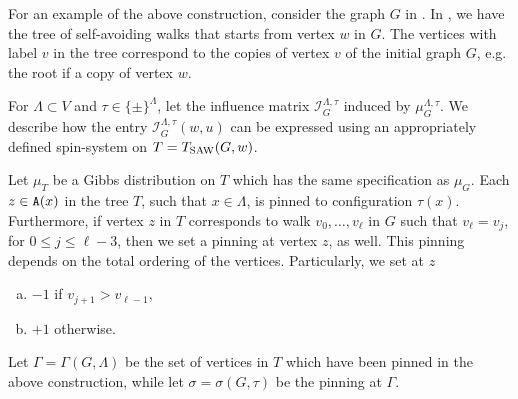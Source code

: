 \documentclass[11pt,reqno]{amsart}
\numberwithin{equation}{section}
\newcommand{\cI}{{\mathcal{I}}}
\newcommand{\applegreen}[1]{ {\color{applegreen}#1}}
\newcommand{\blue}[1]{{\color{blue}#1}}
\newcommand{\cadmiumgreen}[1]{{\color{cadmiumgreen}#1}}
\newcommand{\coquelicot}[1]{{\color{coquelicot}#1}}
\newcommand{\electricviolet}[1]{{\color{electricviolet}#1}}
\newcommand{\heliotrope}[1]{{\color{heliotrope}#1}}
\newcommand{\red}[1]{{\color{red}#1}}
\newcommand{\Tsaw}{T_{\rm SAW}}
\newcommand{\cp}{{\tt A}}
\newcommand{\infmatrix}{\cI}
\renewcommand{\applegreen}[1]{#1}
\renewcommand{\blue}[1]{#1}
\renewcommand{\cadmiumgreen}[1]{#1}
\renewcommand{\coquelicot}[1]{#1}
\renewcommand{\electricviolet}[1]{#1}
\renewcommand{\heliotrope}[1]{#1}
\renewcommand{\red}[1]{#1}
\newcommand{\kj}{\coquelicot{j}}
\newcommand{\kell}{{\color{green(pigment)}\ell}}%
\newcommand{\ku}{\red{u}}
\newcommand{\kv}{\electricviolet{v}}
\newcommand{\kw}{\blue{w}}
\newcommand{\kx}{\heliotrope{x}}
\newcommand{\kz}{\cadmiumgreen{z}}
\renewcommand{\kj}{j}
\renewcommand{\kell}{\ell}
\renewcommand{\ku}{u}
\renewcommand{\kv}{v}
\renewcommand{\kw}{w}
\renewcommand{\kx}{x}
\renewcommand{\kz}{z}
\begin{document}
For an example of the above construction, consider the graph $G$ in .
In , we have the tree of self-avoiding walks that starts from vertex $\kw$ in $G$.
The vertices with label $\kv$ in the tree  correspond to the copies of  vertex $\kv$ of the initial 
graph $G$, e.g. the root if a copy of vertex $\kw$.




For $\Lambda\subset V$ and $\tau\in \{\pm \}^{\Lambda}$, let 
the influence matrix $\infmatrix^{\Lambda,\tau}_{G}$ induced by $\mu^{\Lambda,\tau}_G$. 
%
We describe how the entry 
$\infmatrix^{\Lambda,\tau}_{G}(\kw,\ku)$ can be expressed using an appropriately defined 
spin-system on $T=\Tsaw(G,\kw)$. 



Let $\mu_T$ be a Gibbs distribution on $T$ which has the same specification as $\mu_G$.
%
Each $\kz \in \cp(\kx)$ in the tree $T$, such 
that $\kx \in \Lambda$, is pinned to   configuration  $\tau(\kx)$. Furthermore, if  
 vertex $\kz$ in $T$  corresponds  to walk  $\kv_0, \ldots, \kv_{\kell}$ in $G$ such that 
$\kv_{\kell}=\kv_j$, for $0\leq j \leq \kell-3$, then  we set a pinning at vertex $\kz$, as well. This pinning 
depends on the  total ordering of the vertices. Particularly, we set at $\kz$
\begin{enumerate}[(a)]	
\item $-1$ if $\kv_{\kj+1}>\kv_{\kell-1}$, 
\item $+1$ otherwise.
\end{enumerate}
Let $\Gamma=\Gamma(G,\Lambda)$ be the set of vertices in $T$ which have been pinned 
in the above construction, while let $\sigma=\sigma(G,\tau)$ be the pinning  at $\Gamma$.
\end{document}
